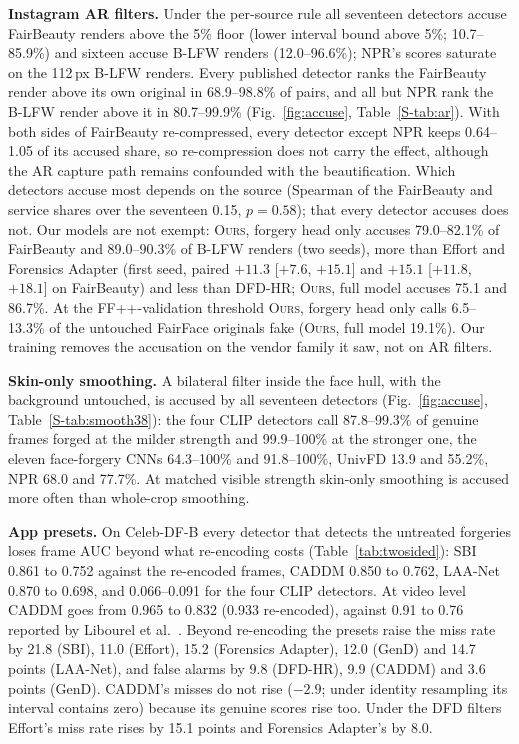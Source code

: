\documentclass[conference]{IEEEtran}
\newcommand{\oursB}{\textsc{Ours}, forgery head only}
\newcommand{\oursF}{\textsc{Ours}, full model}
\begin{document}
\textbf{Instagram AR filters.} Under the per-source rule all seventeen detectors accuse FairBeauty renders above the 5\% floor
(lower interval bound above 5\%; 10.7--85.9\%) and sixteen accuse B-LFW renders (12.0--96.6\%); NPR's scores saturate on the
112\,px B-LFW renders. Every published detector ranks the FairBeauty render above its own original in 68.9--98.8\% of pairs,
and all but NPR rank the B-LFW render above it in 80.7--99.9\% (Fig.~\ref{fig:accuse}, Table~\ref{S-tab:ar}). With both sides of FairBeauty re-compressed, every detector except NPR
keeps 0.64--1.05 of its accused share, so re-compression does not carry the effect, although the AR capture path remains
confounded with the beautification. Which detectors accuse most depends on the source (Spearman of the FairBeauty and service
shares over the seventeen 0.15, $p=0.58$); that every detector accuses does not. Our models are not exempt: \oursB{} accuses
79.0--82.1\% of FairBeauty and 89.0--90.3\% of B-LFW renders (two seeds), more than Effort and Forensics Adapter (first seed,
paired $+11.3$ [$+7.6$, $+15.1$] and $+15.1$ [$+11.8$, $+18.1$] on FairBeauty) and less than DFD-HR; \oursF{} accuses 75.1 and
86.7\%. At the FF++-validation threshold \oursB{} calls 6.5--13.3\% of the untouched FairFace originals fake (\oursF{} 19.1\%).
Our training removes the accusation on the vendor family it saw, not on AR filters.

\textbf{Skin-only smoothing.} A bilateral filter inside the face hull, with the background untouched, is accused by all seventeen
detectors (Fig.~\ref{fig:accuse}, Table~\ref{S-tab:smooth38}): the four CLIP detectors call 87.8--99.3\% of genuine frames forged at
the milder strength and 99.9--100\% at the stronger one, the eleven face-forgery CNNs 64.3--100\% and 91.8--100\%, UnivFD 13.9
and 55.2\%, NPR 68.0 and 77.7\%. At matched visible strength skin-only smoothing is accused more often than whole-crop smoothing.

\textbf{App presets.} On Celeb-DF-B every detector that detects the untreated forgeries loses frame AUC beyond what
re-encoding costs (Table~\ref{tab:twosided}): SBI 0.861 to 0.752 against the re-encoded frames, CADDM 0.850 to 0.762, LAA-Net
0.870 to 0.698, and 0.066--0.091 for the four CLIP detectors. At video level CADDM goes from 0.965 to 0.832 (0.933 re-encoded),
against 0.91 to 0.76 reported by Libourel et al.~\cite{libourel2024}. Beyond re-encoding the presets raise the miss rate by 21.8
(SBI), 11.0 (Effort), 15.2 (Forensics Adapter), 12.0 (GenD) and 14.7 points (LAA-Net), and false alarms by 9.8 (DFD-HR), 9.9
(CADDM) and 3.6 points (GenD). CADDM's misses do not rise ($-2.9$; under identity resampling its interval contains zero) because
its genuine scores rise too. Under the DFD filters Effort's miss rate rises by 15.1 points and Forensics Adapter's by 8.0.
\end{document}
